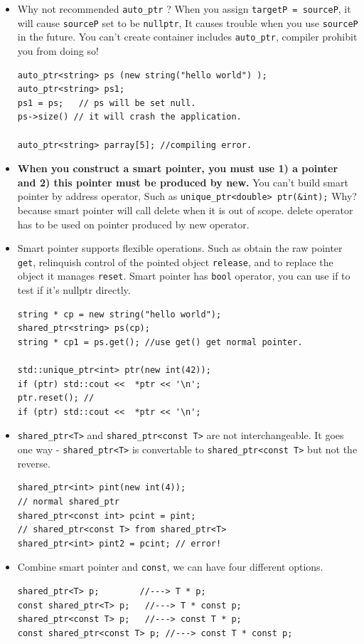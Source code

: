 \documentclass[a4paper,11pt,twoside]{book}
\begin{document}
\begin{itemize}
\item Why not recommended \texttt{auto\_ptr} ? When you assign \texttt{targetP = sourceP}, it will cause \texttt{sourceP} set to be \texttt{nullptr}, It causes trouble when you use \texttt{sourceP} in the future. You can't create container includes \texttt{auto\_ptr}, compiler prohibit you from doing so!

\begin{lstlisting}[numbers=none]
auto_ptr<string> ps (new string("hello world") );
auto_ptr<string> ps1;
ps1 = ps;   // ps will be set null.
ps->size() // it will crash the application.

auto_ptr<string> parray[5]; //compiling error.
\end{lstlisting}

\item \textbf{When you construct a smart pointer, you must use 1) a pointer and 2) this pointer must be produced by new.} You can't build smart pointer by address operator, Such as \texttt{unique\_ptr<double> ptr(\&int);}   Why? because smart pointer will call delete when it is out of scope.  delete operator has to be used on pointer produced by new operator.

\item Smart pointer supports flexible operations. Such as obtain the raw pointer \texttt{get}, relinquish control of the pointed object \texttt{release}, and to replace the object it manages \texttt{reset}. Smart pointer has \texttt{bool} operator, you can use if to test if it's nullptr directly.

\begin{lstlisting}[numbers=none]
string * cp = new string("hello world");
shared_ptr<string> ps(cp);
string * cp1 = ps.get(); //use get() get normal pointer.

std::unique_ptr<int> ptr(new int(42));
if (ptr) std::cout <<  *ptr << '\n';
ptr.reset(); //
if (ptr) std::cout <<  *ptr << '\n';
\end{lstlisting}

\item \texttt{shared\_ptr<T>} and \texttt{shared\_ptr<const T>} are not interchangeable. It goes one way - \texttt{shared\_ptr<T>} is convertable to \texttt{shared\_ptr<const T>} but not the reverse.
\begin{lstlisting}[numbers=none]
shared_ptr<int> pint(new int(4)); 
// normal shared_ptr
shared_ptr<const int> pcint = pint; 
// shared_ptr<const T> from shared_ptr<T>
shared_ptr<int> pint2 = pcint; // error! 
\end{lstlisting}

\item Combine smart pointer and \texttt{const}, we can have four different options.
\begin{lstlisting}[numbers = none]
shared_ptr<T> p;        //---> T * p;
const shared_ptr<T> p;   //---> T * const p;
shared_ptr<const T> p;   //---> const T * p;
const shared_ptr<const T> p; //---> const T * const p;
\end{lstlisting}

\end{itemize}
\end{document}
